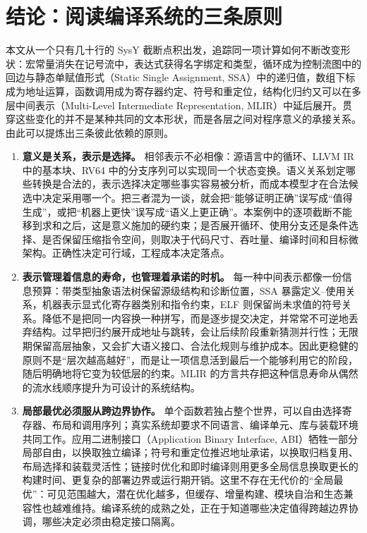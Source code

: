 \section{结论：阅读编译系统的三条原则}
\label{sec:conclusion}

本文从一个只有几十行的 SysY 截断点积出发，追踪同一项计算如何不断改变形状：宏常量消失在记号流中，表达式获得名字绑定和类型，循环成为控制流图中的回边与静态单赋值形式（Static Single Assignment, SSA）中的递归值，数组下标成为地址运算，函数调用成为寄存器约定、符号和重定位，结构化归约又可以在多层中间表示（Multi-Level Intermediate Representation, MLIR）中延后展开。贯穿这些变化的并不是某种共同的文本形状，而是各层之间对程序意义的承接关系。由此可以提炼出三条彼此依赖的原则。

\begin{enumerate}
  \item \textbf{意义是关系，表示是选择。}
  相邻表示不必相像：源语言中的循环、LLVM IR 中的基本块、RV64 中的分支序列可以实现同一个状态变换。语义关系划定哪些转换是合法的，表示选择决定哪些事实容易被分析，而成本模型才在合法候选中决定采用哪一个。把三者混为一谈，就会把“能够证明正确”误写成“值得生成”，或把“机器上更快”误写成“语义上更正确”。本案例中的逐项截断不能移到求和之后，这是意义施加的硬约束；是否展开循环、使用分支还是条件选择、是否保留压缩指令空间，则取决于代码尺寸、吞吐量、编译时间和目标微架构。正确性决定可行域，工程成本决定落点。

  \item \textbf{表示管理着信息的寿命，也管理着承诺的时机。}
  每一种中间表示都像一份信息预算：带类型抽象语法树保留源级结构和诊断位置，SSA 暴露定义--使用关系，机器表示显式化寄存器类别和指令约束，ELF 则保留尚未求值的符号关系。降低不是把同一内容换一种拼写，而是逐步提交决定，并常常不可逆地丢弃结构。过早把归约展开成地址与跳转，会让后续阶段重新猜测并行性；无限期保留高层抽象，又会扩大语义接口、合法化规则与维护成本。因此更稳健的原则不是“层次越高越好”，而是让一项信息活到最后一个能够利用它的阶段，随后明确地将它变为较低层的约束。MLIR 的方言共存把这种信息寿命从偶然的流水线顺序提升为可设计的系统结构。

  \item \textbf{局部最优必须服从跨边界协作。}
  单个函数若独占整个世界，可以自由选择寄存器、布局和调用序列；真实系统却要求不同语言、编译单元、库与装载环境共同工作。应用二进制接口（Application Binary Interface, ABI）牺牲一部分局部自由，以换取独立编译；符号和重定位推迟地址承诺，以换取归档复用、布局选择和装载灵活性；链接时优化和即时编译则用更多全局信息换取更长的构建时间、更复杂的部署边界或运行期开销。这里不存在无代价的“全局最优”：可见范围越大，潜在优化越多，但缓存、增量构建、模块自治和生态兼容性也越难维持。编译系统的成熟之处，正在于知道哪些决定值得跨越边界协调，哪些决定必须由稳定接口隔离。
\end{enumerate}

